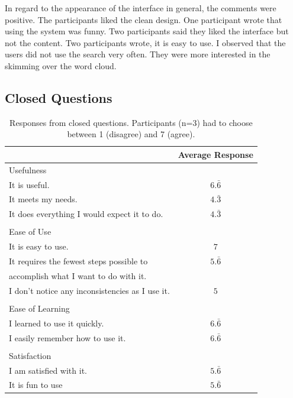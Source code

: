 \documentclass[11pt]{report}
\begin{document}
In regard to the appearance of the interface in general, the comments were positive. The participants liked the clean design. One participant wrote that using the system was funny. Two participants said they liked the interface but not the content. Two participants wrote, it is easy to use. I observed that the users did not use the search very often. They were more interested in the skimming over the word cloud.

\subsection{Closed Questions}

\begin{table}[h]
\caption{Responses from closed questions. Participants (n=3) had to choose between 1 (disagree) and 7 (agree). }
\label{table:closed}
\centering

\def\arraystretch{1.2}%
\begin{tabular}{ | l | c |}
\hline
& Average Response\\
\hline
\large{Usefulness}&\\
It is useful.&$6.\bar{6}$\\
It meets my needs.&$4.\bar{3}$\\
It does everything I would expect it to do.&$4.\bar{3}$\\
&\\
\large{Ease of Use}&\\
It is easy to use.&$7$\\
It requires the fewest steps possible to&$5.\bar{6}$\\
accomplish what I want to do with it.&\\
I don't notice any inconsistencies as I use it.&$5$\\
&\\
\large{Ease of Learning}&\\
I learned to use it quickly.&$6.\bar{6}$\\
I easily remember how to use it.&$6.\bar{6}$\\
&\\
\large{Satisfaction}&\\
I am satisfied with it.&$5.\bar{6}$\\
It is fun to use&$5.\bar{6}$\\

\hline

\end{tabular}
\end{table}
\end{document}
